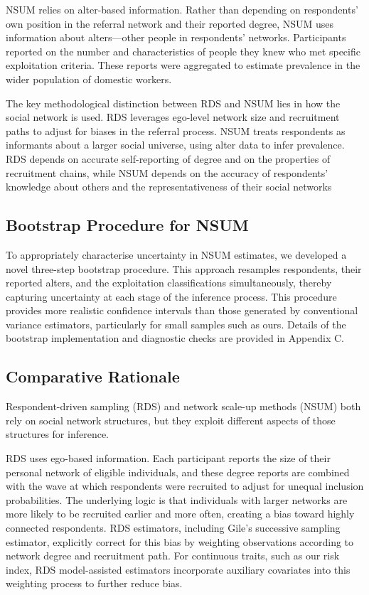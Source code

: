 \documentclass[
  12pt,
  letterpaper,
  DIV=11,
  numbers=noendperiod]{scrartcl}
\theoremstyle{plain}
\theoremstyle{definition}
\begin{document}
NSUM relies on alter-based information. Rather than depending on
respondents' own position in the referral network and their reported
degree, NSUM uses information about alters---other people in
respondents' networks. Participants reported on the number and
characteristics of people they knew who met specific exploitation
criteria. These reports were aggregated to estimate prevalence in the
wider population of domestic workers.

The key methodological distinction between RDS and NSUM lies in how the
social network is used. RDS leverages ego-level network size and
recruitment paths to adjust for biases in the referral process. NSUM
treats respondents as informants about a larger social universe, using
alter data to infer prevalence. RDS depends on accurate self-reporting
of degree and on the properties of recruitment chains, while NSUM
depends on the accuracy of respondents' knowledge about others and the
representativeness of their social networks

\subsection{Bootstrap Procedure for
NSUM}\label{bootstrap-procedure-for-nsum}

To appropriately characterise uncertainty in NSUM estimates, we
developed a novel three-step bootstrap procedure. This approach
resamples respondents, their reported alters, and the exploitation
classifications simultaneously, thereby capturing uncertainty at each
stage of the inference process. This procedure provides more realistic
confidence intervals than those generated by conventional variance
estimators, particularly for small samples such as ours. Details of the
bootstrap implementation and diagnostic checks are provided in Appendix
C.

\subsection{Comparative Rationale}\label{comparative-rationale}

Respondent-driven sampling (RDS) and network scale-up methods (NSUM)
both rely on social network structures, but they exploit different
aspects of those structures for inference.

RDS uses ego-based information. Each participant reports the size of
their personal network of eligible individuals, and these degree reports
are combined with the wave at which respondents were recruited to adjust
for unequal inclusion probabilities. The underlying logic is that
individuals with larger networks are more likely to be recruited earlier
and more often, creating a bias toward highly connected respondents. RDS
estimators, including Gile's successive sampling estimator, explicitly
correct for this bias by weighting observations according to network
degree and recruitment path. For continuous traits, such as our risk
index, RDS model-assisted estimators incorporate auxiliary covariates
into this weighting process to further reduce bias.
\end{document}
